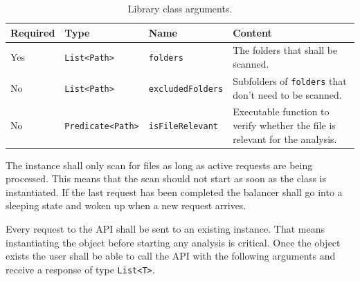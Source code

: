 \documentclass[11pt]{article} %
\begin{document}
    \begin{table}[H]
        \centering
        \begin{tabular}{p{.1\linewidth} | p{.2\linewidth} | p{.2\linewidth} | p{.4\linewidth}}
            \textbf{Required} & \textbf{Type} & \textbf{Name} & \textbf{Content}
            \\\hline
            Yes & \verb|List<Path>| & \verb|folders| & The folders that shall be scanned.
            \\\hline
            No & \verb|List<Path>| & \verb|excludedFolders| &
            Subfolders of
            \verb|folders|\hyperref[fn:1]{\footnotemark[1]} that don't need to be scanned. \\\hline
            No & \verb|Predicate<Path>| & \verb|isFileRelevant| & Executable function to verify whether the file is
            relevant\hyperref[fn:2]{\footnotemark[2]} for the analysis.
        \end{tabular}
        \caption{Library class arguments.}
        \label{tab:lib_args}
    \end{table}
    \label{fn:1}
    \label{fn:2}
    \addtocounter{footnote}{2}

    The instance shall only scan for files as long as active requests are being processed. This means that the scan
    should not start as soon as the class is instantiated. If the last request has been completed the balancer
    shall go into a sleeping state and woken up when a new request arrives.

    Every request to the API shall be sent to an existing instance. That means instantiating the object before
    starting any analysis is critical. Once the object exists the user shall be able to call the API with the following
    arguments and receive a response of type \verb|List<T>|.
\end{document}
